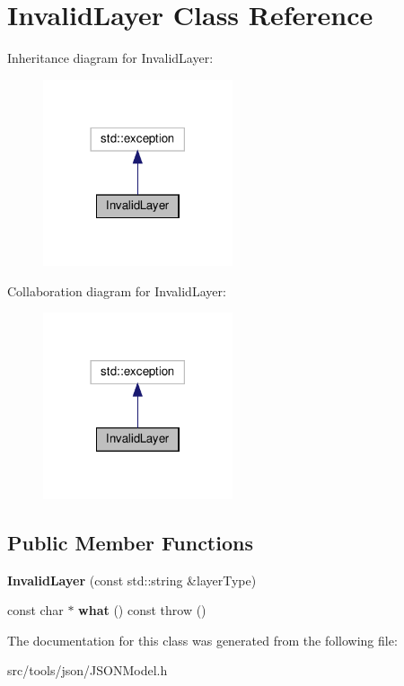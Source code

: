 \hypertarget{classInvalidLayer}{}\section{Invalid\+Layer Class Reference}
\label{classInvalidLayer}


Inheritance diagram for Invalid\+Layer\+:
\nopagebreak
\begin{figure}[H]
\begin{center}
\leavevmode
\includegraphics[width=158pt]{classInvalidLayer__inherit__graph}
\end{center}
\end{figure}


Collaboration diagram for Invalid\+Layer\+:
\nopagebreak
\begin{figure}[H]
\begin{center}
\leavevmode
\includegraphics[width=158pt]{classInvalidLayer__coll__graph}
\end{center}
\end{figure}
\subsection*{Public Member Functions}
\begin{DoxyCompactItemize}
\item 
\mbox{\label{classInvalidLayer_a2c41dc438799b806f908ccd5c8bae995}} 
{\bfseries Invalid\+Layer} (const std\+::string \&layer\+Type)
\item 
\mbox{\label{classInvalidLayer_a83e01dd706508bf237bb77b0dcc1d76d}} 
const char $\ast$ {\bfseries what} () const  throw ()
\end{DoxyCompactItemize}


The documentation for this class was generated from the following file\+:\begin{DoxyCompactItemize}
\item 
src/tools/json/J\+S\+O\+N\+Model.\+h\end{DoxyCompactItemize}
